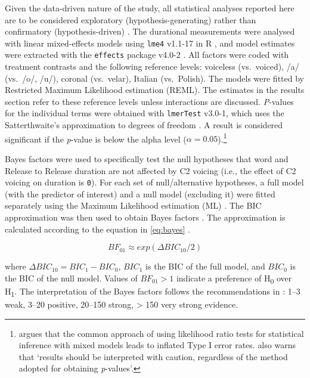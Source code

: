 \documentclass[12pt,]{article}
\let\rmarkdownfootnote\footnote%
\def\footnote{\protect\rmarkdownfootnote}
\begin{document}
Given the data-driven nature of the study, all statistical analyses
reported here are to be considered exploratory (hypothesis-generating)
rather than confirmatory (hypothesis-driven)
\citep{kerr1998, gelman2013, roettger2018}. The durational measurements
were analysed with linear mixed-effects models using \texttt{lme4}
v1.1-17 in R \citep{bates2015}, and model estimates were extracted with
the \texttt{effects} package v4.0-2 \citep{fox2003}. All factors were
coded with treatment contrasts and the following reference levels:
voiceless (vs.~voiced), /a/ (vs.~/o/, /u/), coronal (vs.~velar), Italian
(vs.~Polish). The models were fitted by Restricted Maximum Likelihood
estimation (REML). The estimates in the results section refer to these
reference levels unless interactions are discussed. \emph{P}-values for
the individual terms were obtained with \texttt{lmerTest} v3.0-1, which
uses the Satterthwaite's approximation to degrees of freedom
\citep{kuznetsova2017, luke2017}. A result is considered significant if
the \emph{p}-value is below the alpha level
(\(\alpha = 0.05\)).\footnote{\citet{luke2017} argues that the common approach of using likelihood ratio tests for statistical inference with mixed models leads to inflated Type I error rates. \citet[1501]{luke2017} also warns that `results should be interpreted with caution, regardless of the method adopted for obtaining \textit{p}-values'.}

Bayes factors were used to specifically test the null hypotheses that
word and Release to Release duration are not affected by C2 voicing
(i.e., the effect of C2 voicing on duration is \texttt{0}). For each set
of null/alternative hypotheses, a full model (with the predictor of
interest) and a null model (excluding it) were fitted separately using
the Maximum Likelihood estimation (ML) \citep[p.~34]{bates2015}. The BIC
approximation was then used to obtain Bayes factors
\citep{raftery1995, raftery1999, wagenmakers2007, jarosz2014}. The
approximation is calculated according to the equation in \ref{eq:bayes}
\citep[p.~796]{wagenmakers2007}.

\begin{equation}
\label{eq:bayes}
BF_{01} \approx exp(\Delta{}BIC_{10}/2)
\end{equation}

where \(\Delta{}BIC_{10} = BIC_1 - BIC_0\), \(BIC_1\) is the BIC of the
full model, and \(BIC_0\) is the BIC of the null model. Values of
\(BF_{01} > 1\) indicate a preference of H\textsubscript{0} over
H\textsubscript{1}. The interpretation of the Bayes factors follows the
recommendations in \citet[p.~139]{raftery1995}: 1--3 weak, 3--20
positive, 20--150 strong, \textgreater{} 150 very strong evidence.
\end{document}
